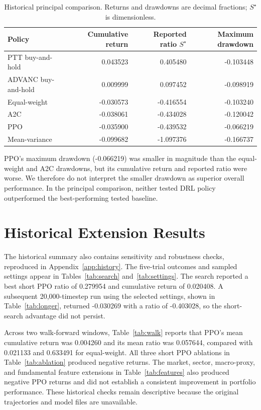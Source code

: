 \documentclass[12pt,a4paper,oneside]{book}
\theoremstyle{plain}
\numberwithin{equation}{chapter} \DeclareMathOperator{\Var}{Var}
\begin{document}
\begin{table}[H]
\centering
\small
\caption{Historical principal comparison. Returns and drawdowns are decimal fractions; $S^\star$ is dimensionless.}
\label{tab:pilot-performance}
\begin{tabular}{@{}lrrr@{}}
\toprule
Policy & Cumulative return & Reported ratio $S^\star$ & Maximum drawdown \\
\midrule
PTT buy-and-hold & 0.043523 & 0.405480 & -0.103448 \\
ADVANC buy-and-hold & 0.009999 & 0.097452 & -0.098919 \\
Equal-weight & -0.030573 & -0.416554 & -0.103240 \\
A2C & -0.038061 & -0.434028 & -0.120042 \\
PPO & -0.035900 & -0.439532 & -0.066219 \\
Mean-variance & -0.099682 & -1.097376 & -0.166737 \\
\bottomrule
\end{tabular}
\end{table}

PPO's maximum drawdown (-0.066219) was smaller in magnitude than the equal-weight and A2C drawdowns, but its cumulative return and reported ratio were worse. We therefore do not interpret the smaller drawdown as superior overall performance. In the principal comparison, neither tested DRL policy outperformed the best-performing tested baseline.

\section{Historical Extension Results}
The historical summary also contains sensitivity and robustness checks, reproduced in Appendix~\ref{app:history}. The five-trial outcomes and sampled settings appear in Tables~\ref{tab:search} and~\ref{tab:settings}. The search reported a best short PPO ratio of 0.279954 and cumulative return of 0.020408. A subsequent 20,000-timestep run using the selected settings, shown in Table~\ref{tab:longer}, returned -0.030269 with a ratio of -0.403028, so the short-search advantage did not persist.

Across two walk-forward windows, Table~\ref{tab:walk} reports that PPO's mean cumulative return was 0.004260 and its mean ratio was 0.057644, compared with 0.021133 and 0.633491 for equal-weight. All three short PPO ablations in Table~\ref{tab:ablation} produced negative returns. The market, sector, macro-proxy, and fundamental feature extensions in Table~\ref{tab:features} also produced negative PPO returns and did not establish a consistent improvement in portfolio performance. These historical checks remain descriptive because the original trajectories and model files are unavailable.
\end{document}
